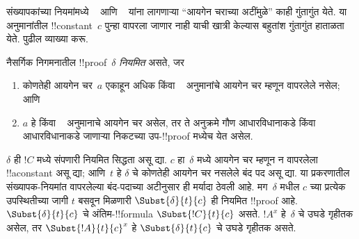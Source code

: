\documentclass[../../../include/open-logic-section]{subfiles}
\begin{document}


संख्यापकांच्या नियमांमध्ये
~\Elim{\lexists} आणि
~\Intro{\lforall} यांना
लागणाऱ्या “आयगेन चराच्या
अटींमुळे” काही गुंतागुंत येते.
या अनुमानांतील
!!{constant}~$c$ पुन्हा
वापरला जाणार नाही याची
खात्री केल्यास बहुतांश
गुंतागुंत हाताळता येते.
पुढील व्याख्या करू.

\begin{defn}
नैसर्गिक निगमनातील
!!{proof}~$\delta$
\emph{नियमित} असते, जर
\begin{enumerate}
  \item कोणतेही आयगेन
  चर~$a$ एकाहून अधिक
  \Elim{\lexists} किंवा
  ~\Intro{\lforall} अनुमानांचे
  आयगेन चर म्हणून वापरलेले
  नसेल; आणि
  \item $a$ हे
  \Elim{\lexists} किंवा
  ~\Intro{\lforall} अनुमानाचे
  आयगेन चर असेल, तर ते
  अनुक्रमे गौण आधारविधानाकडे
  किंवा आधारविधानाकडे
  जाणाऱ्या निकटच्या
  उप-!!{proof} मध्येच
  येत असेल.
\end{enumerate}
\end{defn}

\begin{lem}
$\delta$ ही $!C$ मध्ये
संपणारी नियमित सिद्धता असू द्या.
$c$ हा~$\delta$ मध्ये
आयगेन चर म्हणून न वापरलेला
!!a{constant} असू द्या;
आणि~$t$ हे $\delta$
चे कोणतेही आयगेन चर नसलेले
बंद पद असू द्या. या प्रकरणातील संख्यापक-नियमांत
वापरलेल्या बंद-पदाच्या अटीनुसार ही मर्यादा ठेवली आहे. मग~$\delta$
मधील $c$ च्या प्रत्येक
उपस्थितीच्या जागी $t$
बसवून मिळणारी
$\Subst{\delta}{t}{c}$
ही नियमित !!{proof} आहे.
$\Subst{\delta}{t}{c}$
चे अंतिम-!!{formula}
$\Subst{!C}{t}{c}$ असते.
$!A^x$ हे~$\delta$
चे उघडे गृहीतक असेल,
तर $\Subst{!A}{t}{c}^x$
हे $\Subst{\delta}{t}{c}$
चे उघडे गृहीतक असते.
\end{lem}
\end{document}
